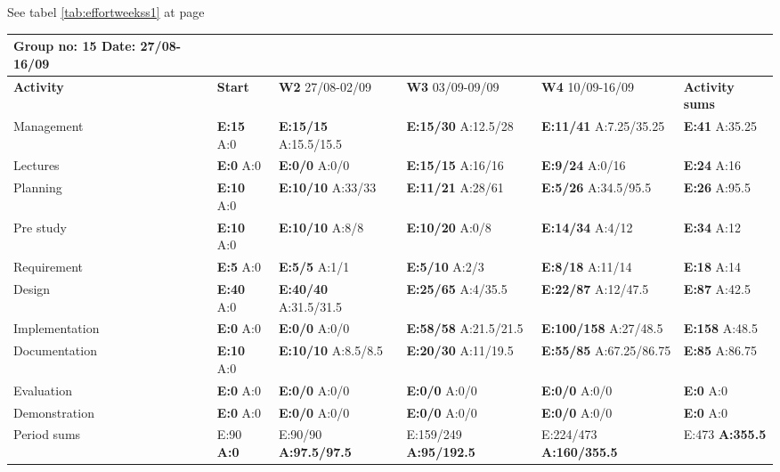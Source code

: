 See tabel \ref{tab:effortweekss1} at page \pageref{tab:effortweekss1}
\begin{table}
\begin{tabularx}{\linewidth}{>{\setlength\hsize{.625\hsize}}X|>{\setlength\hsize{0.3\hsize}}X|>{\setlength\hsize{0.5\hsize}}X|>{\setlength\hsize{0.5\hsize}}X|>{\setlength\hsize{0.5\hsize}}X|>{\setlength\hsize{.3\hsize}}X}
Group no: 15 Date: 27/08-16/09  \\ \hline
\textbf{Activity} & \textbf{Start} & \textbf{W2} 27/08-02/09 & \textbf{W3} 03/09-09/09 & \textbf{W4} 10/09-16/09 & \textbf{Activity sums} \\ \hline \hline
Management & \textbf{E:15} A:0 & \textbf{E:15/15} A:15.5/15.5 & \textbf{E:15/30} A:12.5/28 & \textbf{E:11/41} A:7.25/35.25 & \textbf{E:41} A:35.25  \\ \hline
Lectures & \textbf{E:0} A:0 & \textbf{E:0/0} A:0/0 & \textbf{E:15/15} A:16/16 & \textbf{E:9/24} A:0/16 & \textbf{E:24 } A:16  \\ \hline
Planning & \textbf{E:10} A:0 & \textbf{E:10/10} A:33/33 & \textbf{E:11/21} A:28/61 & \textbf{E:5/26} A:34.5/95.5 & \textbf{E:26 } A:95.5  \\ \hline
Pre study & \textbf{E:10} A:0 & \textbf{E:10/10} A:8/8 & \textbf{E:10/20} A:0/8 & \textbf{E:14/34} A:4/12 & \textbf{E:34 } A:12  \\ \hline
Requirement & \textbf{E:5} A:0 & \textbf{E:5/5} A:1/1 & \textbf{E:5/10} A:2/3 & \textbf{E:8/18} A:11/14 & \textbf{E:18 } A:14  \\ \hline
Design & \textbf{E:40} A:0 & \textbf{E:40/40} A:31.5/31.5 & \textbf{E:25/65} A:4/35.5 & \textbf{E:22/87} A:12/47.5 & \textbf{E:87 } A:42.5  \\ \hline
Implementation & \textbf{E:0} A:0 & \textbf{E:0/0} A:0/0 & \textbf{E:58/58} A:21.5/21.5 & \textbf{E:100/158} A:27/48.5 & \textbf{E:158 } A:48.5  \\ \hline
Documentation & \textbf{E:10} A:0 & \textbf{E:10/10} A:8.5/8.5 & \textbf{E:20/30} A:11/19.5 & \textbf{E:55/85} A:67.25/86.75 & \textbf{E:85 } A:86.75  \\ \hline
Evaluation & \textbf{E:0} A:0 & \textbf{E:0/0} A:0/0 & \textbf{E:0/0} A:0/0 & \textbf{E:0/0} A:0/0 & \textbf{E:0 } A:0  \\ \hline
Demonstration & \textbf{E:0} A:0 & \textbf{E:0/0} A:0/0 & \textbf{E:0/0} A:0/0 & \textbf{E:0/0} A:0/0 & \textbf{E:0 } A:0  \\ \hline
Period sums & E:90 \textbf{A:0} & E:90/90 \textbf{A:97.5/97.5} & E:159/249 \textbf{A:95/192.5} & E:224/473 \textbf{A:160/355.5} & E:473 \textbf{A:355.5}
\end{tabularx}


\end{table}
